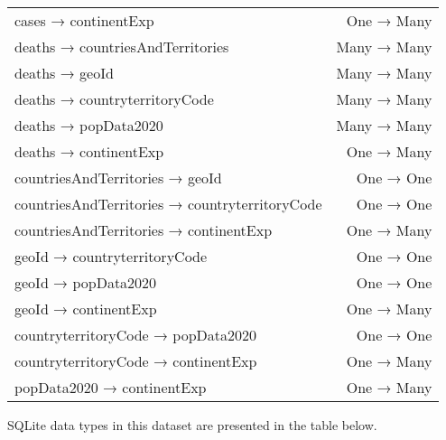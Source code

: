 \documentclass[]{article}
\begin{document}
\begin{longtable}[c]{@{}lr@{}}
cases → continentExp                           & One → Many                        \\
deaths → countriesAndTerritories               & Many → Many                       \\
deaths → geoId                                 & Many → Many                       \\
deaths → countryterritoryCode                  & Many → Many                       \\
deaths → popData2020                           & Many → Many                       \\
deaths → continentExp                          & One → Many                        \\
countriesAndTerritories → geoId                & One → One                         \\
countriesAndTerritories → countryterritoryCode & One → One                         \\
countriesAndTerritories → continentExp         & One → Many                        \\
geoId → countryterritoryCode                   & One → One                         \\
geoId → popData2020                            & One → One                         \\
geoId → continentExp                           & One → Many                        \\
countryterritoryCode → popData2020             & One → One                         \\
countryterritoryCode → continentExp            & One → Many                        \\
popData2020 → continentExp                     & One → Many                        \\* \bottomrule
\end{longtable}
\noindent
SQLite data types in this dataset are presented in the table below.
\end{document}
